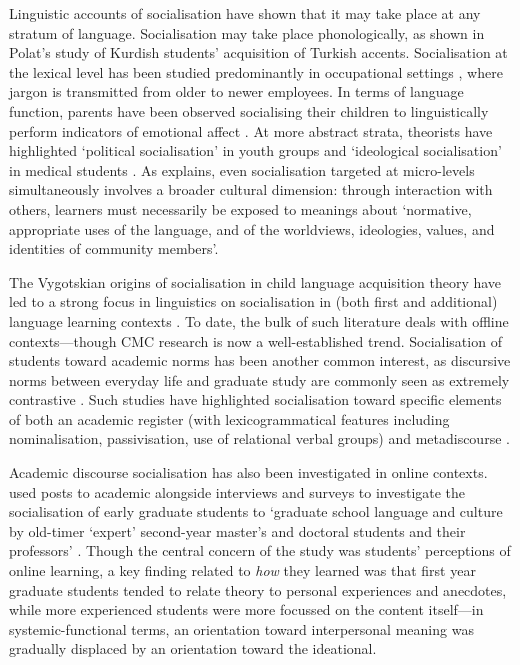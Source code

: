 Linguistic accounts of socialisation have shown that it may take place at any stratum of language. Socialisation may take place phonologically, as shown in Polat's \cite*{polat_nature_2011} study of Kurdish students' acquisition of Turkish accents. Socialisation at the lexical level has been studied predominantly in occupational settings \cite[e.g.][]{wolf_learning_1989}, where jargon is transmitted from older to newer employees. In terms of language function, parents have been observed socialising their children to linguistically perform indicators of emotional affect \cite{clancy_socialization_1999}. At more abstract strata, theorists have highlighted `political socialisation' in youth groups \cite{lee_processes_2013} and `ideological socialisation' in medical students \cite{harter_exploring_2001}. As \textcite[p.~172]{duff_language_2010} explains, even socialisation targeted at micro-levels simultaneously involves a broader cultural dimension: through interaction with others, learners must necessarily be exposed to meanings about `normative, appropriate uses of the language, and of the worldviews, ideologies, values, and identities of community members'.

The Vygotskian origins of socialisation in child language acquisition theory have led to a strong focus in linguistics on socialisation in (both first and additional) language learning contexts \cite{ochs_socialization_1991}. To date, the bulk of such literature deals with offline contexts---though \gls{CMC} research is now a well\hyp{}established trend. Socialisation of students toward academic norms has been another common interest, as discursive norms between everyday life and graduate study are commonly seen as extremely contrastive \cite{beckett_students_2010}. Such studies have highlighted socialisation toward specific elements of both an academic register (with lexicogrammatical features including nominalisation, passivisation, use of relational verbal groups) and metadiscourse \cite{mauranen__2003}.

Academic discourse socialisation has also been investigated in online contexts. \textcite{beckett_students_2010} used \glspl{post} to academic  alongside interviews and surveys to investigate the socialisation of early graduate students to `graduate school language and culture by old-timer `expert' second-year master's and doctoral students and their professors' \parencite*[p.~319]{beckett_students_2010}. Though the central concern of the study was students' perceptions of online learning, a key finding related to \emph{how} they learned was that first year graduate students tended to relate theory to personal experiences and anecdotes, while more experienced students were more focussed on the content itself---in systemic\hyp{}functional terms, an orientation toward interpersonal meaning was gradually displaced by an orientation toward the ideational.

